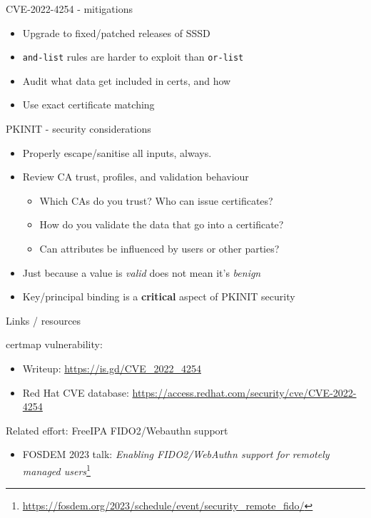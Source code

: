 \documentclass[ignorenonframetext,aspectratio=169,12pt]{beamer}
\begin{document}
\begin{frame}{CVE-2022-4254 - mitigations}
\protect\hypertarget{vuln-mitigations}{}

\begin{itemize}
\item Upgrade to fixed/patched releases of SSSD
\item {\tt and-list} rules are harder to exploit than {\tt or-list}
\item Audit what data get included in certs, and how
\item Use exact certificate matching
\end{itemize}
\end{frame}

\begin{frame}{PKINIT - security considerations}
\protect\hypertarget{pkinit-security-considerations}{}

\begin{itemize}
\item Properly escape/sanitise all inputs, always.
\item Review CA trust, profiles, and validation behaviour
    \begin{itemize}
    \item Which CAs do you trust?  Who can issue certificates?
    \item How do you validate the data that go into a certificate?
    \item Can attributes be influenced by users or other parties?
    \end{itemize}
\item Just because a value is {\em valid} does not mean it's {\em benign}
\item Key/principal binding is a {\bf critical} aspect of PKINIT security
\end{itemize}
\end{frame}


\begin{frame}{Links / resources}
\protect\hypertarget{links}{}

certmap vulnerability:
\begin{itemize}
\item Writeup: \url{https://is.gd/CVE_2022_4254}
\item Red Hat CVE database: \url{https://access.redhat.com/security/cve/CVE-2022-4254}
\end{itemize}

Related effort: FreeIPA FIDO2/Webauthn support
\begin{itemize}
    \item FOSDEM 2023 talk: {\em Enabling FIDO2/WebAuthn support for
        remotely managed users}\footnote{\url{https://fosdem.org/2023/schedule/event/security_remote_fido/}}
\end{itemize}

\end{frame}
\end{document}
